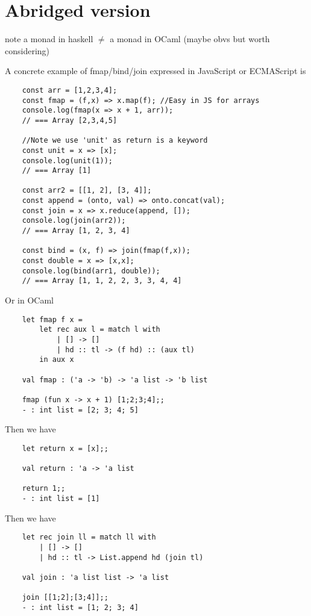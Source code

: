 \section{Abridged version}

note a monad in haskell $\neq$ a monad in OCaml
(maybe obvs but worth considering)

A concrete example of fmap/bind/join expressed in JavaScript or ECMAScript is
\begin{verbatim}
    const arr = [1,2,3,4];
    const fmap = (f,x) => x.map(f); //Easy in JS for arrays
    console.log(fmap(x => x + 1, arr));
    // === Array [2,3,4,5]

    //Note we use 'unit' as return is a keyword
    const unit = x => [x];
    console.log(unit(1));
    // === Array [1]

    const arr2 = [[1, 2], [3, 4]];
    const append = (onto, val) => onto.concat(val);
    const join = x => x.reduce(append, []);
    console.log(join(arr2));
    // === Array [1, 2, 3, 4]

    const bind = (x, f) => join(fmap(f,x));
    const double = x => [x,x];
    console.log(bind(arr1, double));
    // === Array [1, 1, 2, 2, 3, 3, 4, 4]
\end{verbatim}


Or in OCaml
\begin{verbatim}
    let fmap f x =
        let rec aux l = match l with
            | [] -> []
            | hd :: tl -> (f hd) :: (aux tl)
        in aux x

    val fmap : ('a -> 'b) -> 'a list -> 'b list

    fmap (fun x -> x + 1) [1;2;3;4];;
    - : int list = [2; 3; 4; 5]
\end{verbatim}
Then we have
\begin{verbatim}
    let return x = [x];;

    val return : 'a -> 'a list

    return 1;;
    - : int list = [1]
\end{verbatim}
Then we have
\begin{verbatim}
    let rec join ll = match ll with
        | [] -> []
        | hd :: tl -> List.append hd (join tl)

    val join : 'a list list -> 'a list

    join [[1;2];[3;4]];;
    - : int list = [1; 2; 3; 4]
\end{verbatim}

